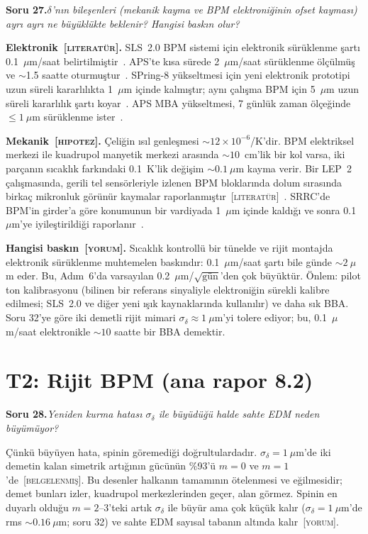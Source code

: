 \documentclass[11pt,a4paper]{article}
\newcommand{\BEL}{\textsc{[belgelenmiş]}}
\newcommand{\YOR}{\textsc{[yorum]}}
\newcommand{\HIP}{\textsc{[hipotez]}}
\newcommand{\LIT}{\textsc{[literatür]}}
\newcounter{soru}
\newcommand{\soru}[2]{%
  \par\medskip\noindent\textbf{Soru #1.}\enspace\textit{#2}\par\nopagebreak\smallskip}
\begin{document}
\soru{27}{$\delta$'nın bileşenleri (mekanik kayma ve BPM elektroniğinin ofset kayması) ayrı ayrı ne
büyüklükte beklenir? Hangisi baskın olur?}

\textbf{Elektronik~\LIT.} SLS~2.0 BPM sistemi için elektronik sürüklenme şartı 0.1~$\mu$m/saat
belirtilmiştir~\cite{sls2}. APS'te kısa sürede 2~$\mu$m/saat sürüklenme ölçülmüş ve $\sim$1.5 saatte
oturmuştur~\cite{aps_drift}. SPring-8 yükseltmesi için yeni elektronik prototipi uzun süreli kararlılıkta
1~$\mu$m içinde kalmıştır; aynı çalışma BPM için 5~$\mu$m uzun süreli kararlılık şartı koyar~\cite{spring8}.
APS MBA yükseltmesi, 7 günlük zaman ölçeğinde $\le1~\mu$m sürüklenme ister~\cite{aps_mba}.

\textbf{Mekanik~\HIP.} Çeliğin ısıl genleşmesi $\sim12\times10^{-6}$/K'dir. BPM elektriksel merkezi ile
kuadrupol manyetik merkezi arasında $\sim10$~cm'lik bir kol varsa, iki parçanın sıcaklık farkındaki 0.1~K'lik
değişim $\sim0.1~\mu$m kayma verir. Bir LEP~2 çalışmasında, gerili tel sensörleriyle izlenen BPM bloklarında
dolum sırasında birkaç mikronluk görünür kaymalar raporlanmıştır~\LIT~\cite{lep}. SRRC'de BPM'in girder'a
göre konumunun bir vardiyada 1~$\mu$m içinde kaldığı ve sonra 0.1~$\mu$m'ye iyileştirildiği raporlanır~\cite{lep}.

\textbf{Hangisi baskın~\YOR.} Sıcaklık kontrollü bir tünelde ve rijit montajda elektronik sürüklenme
muhtemelen baskındır: 0.1~$\mu$m/saat şartı bile günde $\sim2~\mu$m eder. Bu, Adım~6'da varsayılan
0.2~$\mu$m/$\sqrt{\text{gün}}$'den çok büyüktür. Önlem: pilot ton kalibrasyonu (bilinen bir referans
sinyaliyle elektroniğin sürekli kalibre edilmesi; SLS~2.0 ve diğer yeni ışık kaynaklarında kullanılır) ve
daha sık BBA. Soru 32'ye göre iki demetli rijit mimari $\sigma_\delta\approx1~\mu$m'yi tolere ediyor; bu,
0.1~$\mu$m/saat elektronikle $\sim10$ saatte bir BBA demektir.

\section{T2: Rijit BPM (ana rapor 8.2)}

\soru{28}{Yeniden kurma hatası $\sigma_\delta$ ile büyüdüğü halde sahte EDM neden büyümüyor?}

Çünkü büyüyen hata, spinin göremediği doğrultulardadır. $\sigma_\delta=1~\mu$m'de iki demetin kalan simetrik
artığının gücünün \%93'ü $m=0$ ve $m=1$'de~\BEL. Bu desenler halkanın tamamının ötelenmesi ve eğilmesidir;
demet bunları izler, kuadrupol merkezlerinden geçer, alan görmez. Spinin en duyarlı olduğu $m=2$--3'teki
artık $\sigma_\delta$ ile büyür ama çok küçük kalır ($\sigma_\delta=1~\mu$m'de rms $\sim0.16~\mu$m; soru 32)
ve sahte EDM sayısal tabanın altında kalır~\YOR.
\end{document}

